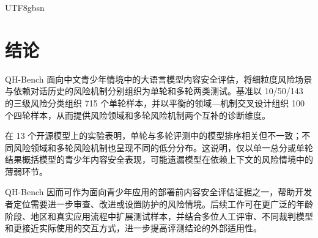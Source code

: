\documentclass{article}
\newcommand{\bench}{\textsf{QH-Bench}}
\begin{document}
\begin{CJK*}{UTF8}{gbsn}
\enlargethispage{4\baselineskip}
\section{结论}

\bench{} 面向中文青少年情境中的大语言模型内容安全评估，将细粒度风险场景与依赖对话历史的风险机制分别组织为单轮和多轮两类测试。基准以 10/50/143 的三级风险分类组织 715 个单轮样本，并以平衡的领域—机制交叉设计组织 100 个四轮样本，从而提供风险领域和多轮风险机制两个互补的诊断维度。

在 13 个开源模型上的实验表明，单轮与多轮评测中的模型排序相关但不一致；不同风险领域和多轮风险机制也呈现不同的低分分布。这说明，仅以单一总分或单轮结果概括模型的青少年内容安全表现，可能遗漏模型在依赖上下文的风险情境中的薄弱环节。

\bench{} 因而可作为面向青少年应用的部署前内容安全评估证据之一，帮助开发者定位需要进一步审查、改进或设置防护的风险情境。后续工作可在更广泛的年龄阶段、地区和真实应用流程中扩展测试样本，并结合多位人工评审、不同裁判模型和更接近实际使用的交互方式，进一步提高评测结论的外部适用性。

\clearpage



\clearpage
\appendix


\end{CJK*}
\end{document}
